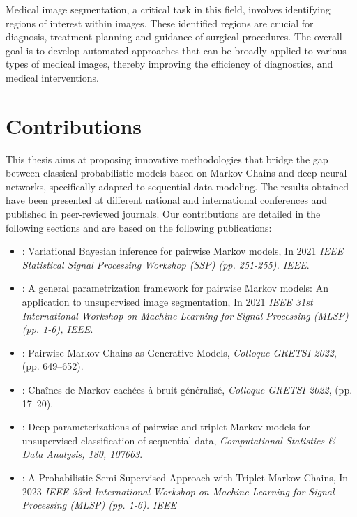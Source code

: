 Medical image segmentation, a critical task in
this field, involves identifying regions of interest within images. These
identified regions are crucial for diagnosis, treatment planning and guidance of
surgical procedures. The overall goal is to develop automated approaches that
can be broadly applied to various types of medical images, thereby improving the
efficiency of diagnostics, and medical interventions.


\vspace{.30cm}
\section*{Contributions}

This thesis aims at proposing 
innovative methodologies that bridge the gap between
classical probabilistic models based on Markov Chains and deep neural networks,
specifically adapted to sequential data modeling. 
The results obtained have been presented at different national and international conferences
and published in peer-reviewed journals. Our contributions are detailed 
in the following sections and are based on the following publications:

\begin{itemize}
    \item \cite{morales2021variational}: Variational Bayesian inference for
    pairwise Markov models, In 2021 \textit{IEEE Statistical Signal Processing Workshop
    (SSP) (pp. 251-255). IEEE}.
    \item \citet*{gangloff2021general}:  A
    general parametrization framework for pairwise Markov models: An application
    to unsupervised image segmentation, In 2021 \textit{IEEE 31st International Workshop
    on Machine Learning for Signal Processing (MLSP) (pp. 1-6), IEEE}.
    \item \cite{morales2022pairwise}: Pairwise Markov Chains as Generative Models,
    \textit{Colloque GRETSI 2022}, (pp. 649–652).
    \item \citet*{gangloff2022chaines}: Chaînes de Markov cachées à bruit
    généralisé, \textit{Colloque GRETSI 2022},  (pp. 17–20).
    \item \citet*{gangloff2023deep}: Deep parameterizations of pairwise and
    triplet Markov models for unsupervised classification of sequential data,
    \textit{Computational Statistics \& Data Analysis, 180, 107663}.
    \item \cite{morales2023probabilistic}: 
    A Probabilistic Semi-Supervised Approach with Triplet Markov Chains, In 2023
    \textit{IEEE 33rd International Workshop
    on Machine Learning for Signal Processing (MLSP) (pp. 1-6). IEEE}
\end{itemize}

